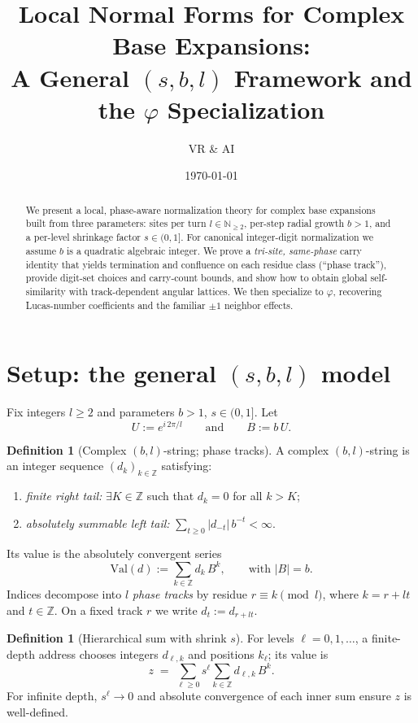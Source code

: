 \documentclass[11pt]{article}
\title{\textbf{Local Normal Forms for Complex Base Expansions:\\
A General $(s,b,l)$ Framework and the $\varphi$ Specialization}}
\author{VR \& AI}
\date{\today}
\theoremstyle{definition}
\newtheorem{definition}[theorem]{Definition}
\theoremstyle{remark}
\newcommand{\Val}{\mathrm{Val}}
\newcommand{\Z}{\mathbb{Z}}
\newcommand{\N}{\mathbb{N}}
\begin{document}
\maketitle

\begin{abstract}
We present a local, phase-aware normalization theory for complex base expansions built from three parameters: sites per turn $l\in\N_{\ge2}$, per-step radial growth $b>1$, and a per-level shrinkage factor $s\in(0,1]$. For canonical integer-digit normalization we assume $b$ is a quadratic algebraic integer. We prove a \emph{tri-site, same-phase} carry identity that yields termination and confluence on each residue class (``phase track''), provide digit-set choices and carry-count bounds, and show how to obtain global self-similarity with track-dependent angular lattices. We then specialize to $\varphi$, recovering Lucas-number coefficients and the familiar $\pm1$ neighbor effects.
\end{abstract}

\section{Setup: the general $(s,b,l)$ model}\label{sec:setup}
Fix integers $l\ge2$ and parameters $b>1$, $s\in(0,1]$. Let
\[
U:=e^{i\,2\pi/l}\qquad\text{and}\qquad B:=b\,U.
\]

\begin{definition}[Complex $(b,l)$-string; phase tracks]\label{def:string}
A complex $(b,l)$-string is an integer sequence $(d_k)_{k\in\Z}$ satisfying:
\begin{enumerate}
\item \emph{finite right tail:} $\exists K\in\Z$ such that $d_k=0$ for all $k>K$;\vspace{2pt}
\item \emph{absolutely summable left tail:} $\sum_{t\ge0} |d_{-t}|\,b^{-t}<\infty$.
\end{enumerate}
Its value is the absolutely convergent series
\[
\Val(d):=\sum_{k\in\Z} d_k\,B^k,\qquad\text{with }|B|=b.
\]
Indices decompose into $l$ \emph{phase tracks} by residue $r\equiv k\pmod l$, where $k=r+lt$ and $t\in\Z$. On a fixed track $r$ we write $d_t:=d_{r+lt}$.
\end{definition}

\begin{definition}[Hierarchical sum with shrink $s$]\label{def:hier}
For levels $\ell=0,1,\dots$, a finite-depth address chooses integers $d_{\ell,k}$ and positions $k_\ell$; its value is
\[
z \;=\; \sum_{\ell\ge0} s^{\ell}\!\sum_{k\in\Z} d_{\ell,k}\,B^{k}.
\]
For infinite depth, $s^\ell\to0$ and absolute convergence of each inner sum ensure $z$ is well-defined.
\end{definition}
\end{document}
